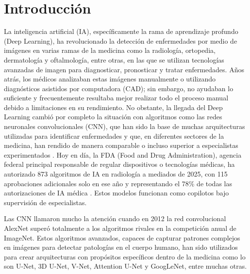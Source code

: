 \section{Introducción}

  
La inteligencia artificial (IA), específicamente la rama de aprendizaje profundo (Deep Learning), ha revolucionado la detección de enfermedades por medio de imágenes en varias ramas de la medicina como la radiología, ortopedia, dermatología y oftalmología, entre otras, en las que se utilizan tecnologías avanzadas de imagen para diagnosticar, pronosticar y tratar enfermedades. Años atrás, los médicos analizaban estas imágenes manualmente o utilizando diagnósticos asistidos por computadora (CAD); sin embargo, no ayudaban lo suficiente y frecuentemente resultaba mejor realizar todo el proceso manual debido a limitaciones en su rendimiento. No obstante, la llegada del Deep Learning cambió por completo la situación con algoritmos como las redes neuronales convolucionales (CNN), que han sido la base de muchas arquitecturas utilizadas para identificar enfermedades y que, en diferentes sectores de la medicina, han rendido de manera comparable o incluso superior a especialistas experimentados . Hoy en día, la FDA (Food and Drug Administration), agencia federal principal responsable de regular dispositivos o tecnologías médicas, ha autorizado 873 algoritmos de IA en radiología a mediados de 2025, con 115 aprobaciones adicionales solo en ese año y representando el 78\% de todas las autorizaciones de IA médica \parencite{Laurent2025}. Estos modelos funcionan como copilotos bajo supervisión de especialistas.

 Las CNN llamaron mucho la atención cuando en 2012 la red convolucional AlexNet superó totalmente a los algoritmos rivales en la competición anual de ImageNet. Estos algoritmos avanzados, capaces de capturar patrones complejos en imágenes para detectar patologías en el cuerpo humano, han sido utilizados para crear arquitecturas con propósitos específicos dentro de la medicina como lo son U-Net, 3D U-Net, V-Net, Attention U-Net y GoogLeNet, entre muchas otras. 
 
